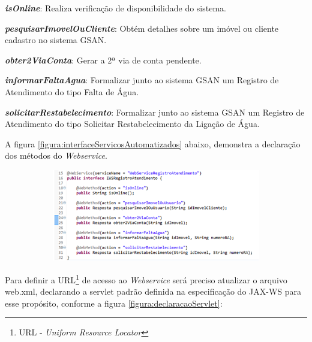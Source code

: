 \begin{description}
	\item \textbf{\textit{isOnline}}: Realiza verificação de disponibilidade do sistema.
	\item \textbf{\textit{pesquisarImovelOuCliente}}: Obtém detalhes sobre um imóvel ou cliente cadastro no sistema GSAN.
	\item \textbf{\textit{obter2ViaConta}}: Gerar a 2ª via de conta pendente.
	\item \textbf{\textit{informarFaltaAgua}}: Formalizar junto ao sistema GSAN um Registro de Atendimento do tipo Falta de Água.
	\item \textbf{\textit{solicitarRestabelecimento}}: Formalizar junto ao sistema GSAN um Registro de Atendimento do tipo Solicitar Restabelecimento da Ligação de Água.
\end{description}

A figura \ref{figura:interfaceServicosAutomatizados} abaixo, demonstra a declaração dos métodos do \textit{Webservice}.

\begin{figure}[H]
	\centering
	\caption{Interface dos serviços automatizados.}	
	\label{figura:interfaceServicosAutomatizados}
	\begin{subfigure}[H]{\textwidth}
		\centering
		\includegraphics{figuras/implementacao_servicos.png}
	\end{subfigure}
\end{figure}



Para definir a URL\footnote{URL - \textit{Uniform Resource Locator}} de acesso ao \textit{Webservice} será preciso atualizar o arquivo web.xml, declarando a servlet padrão definida na especificação do JAX-WS para esse propósito, conforme a figura \ref{figura:declaracaoServlet}:

